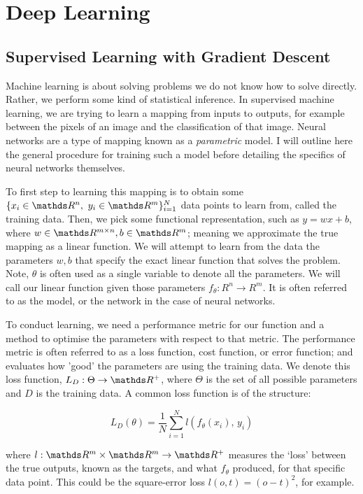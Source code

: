 \section{Deep Learning}
\subsection{Supervised Learning with Gradient Descent}
Machine learning is about solving problems we do not know how to solve directly.
Rather, we perform some kind of statistical inference.
In supervised machine learning, we are trying to learn a mapping from inputs to outputs, for example between the pixels of an image and the classification of that image.
Neural networks are a type of mapping known as a \textit{parametric} model.
I will outline here the general procedure for training such a model before detailing the specifics of neural networks themselves.

To first step to learning this mapping is to obtain some \(\{x_i \in \R^n, \ y_i \in \R^m\}_{i=1}^N\) data points to learn from, called the training data.
Then, we pick some functional representation, such as \(y = wx + b\), where \(w \in \R^{m \times n}, b \in \R^m\); meaning we approximate the true mapping as a linear function.
We will attempt to learn from the data the parameters \(w, b\) that specify the exact linear function that solves the problem.
Note, \(\theta\) is often used as a single variable to denote all the parameters.
We will call our linear function given those parameters \(f_\theta : R^n \rightarrow R^m\).
It is often referred to as the model, or the network in the case of neural networks.

To conduct learning, we need a performance metric for our function and a method to optimise the parameters with respect to that metric. The performance metric is often referred to as a loss function, cost function, or error function; and evaluates how 'good' the parameters are using the training data. We denote this loss function, \(L_D : \Theta \rightarrow \R^+\), where \(\Theta\) is the set of all possible parameters and \(D\) is the training data. A common loss function is of the structure:

\begin{equation*}
    L_D(\theta) = \frac{1}{N}\sum_{i=1}^N l(f_\theta(x_i),\, y_i)
\end{equation*}

where \(l : \R^m\times\R^m \rightarrow \R^+\) measures the `loss' between the true outputs, known as the targets, and what \(f_{\theta}\) produced, for that specific data point. This could be the square-error loss \(l(o, t) = (o-t)^2\), for example.

